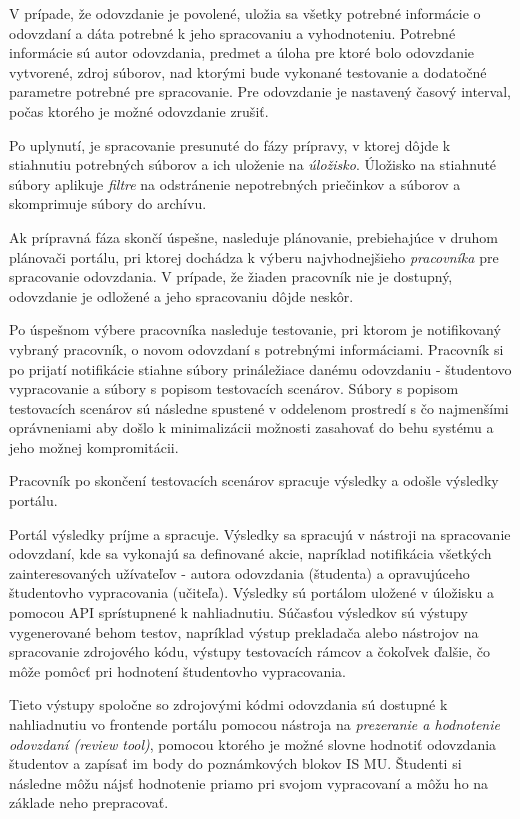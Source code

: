 \documentclass[
  digital, %
  twoside, %
  table,   %
  lof,     %
  lot,     %
]{fithesis3}
\begin{document}
V prípade, že odovzdanie je povolené, uložia sa všetky potrebné informácie o odovzdaní a dáta potrebné k jeho spracovaniu a vyhodnoteniu. Potrebné informácie sú autor odovzdania, predmet a úloha pre ktoré bolo odovzdanie vytvorené, zdroj súborov, nad ktorými bude vykonané testovanie a dodatočné parametre potrebné pre spracovanie. Pre odovzdanie je nastavený časový interval, počas ktorého je možné odovzdanie zrušiť.

Po uplynutí, je spracovanie presunuté do fázy prípravy, v ktorej dôjde k stiahnutiu potrebných súborov a ich uloženie na \emph{úložisko}. Úložisko na stiahnuté súbory aplikuje \emph{filtre} na odstránenie nepotrebných priečinkov a súborov a skomprimuje súbory do archívu.

Ak prípravná fáza skončí úspešne, nasleduje plánovanie, prebiehajúce v druhom plánovači portálu, pri ktorej dochádza k výberu najvhodnejšieho \emph{pracovníka} pre spracovanie odovzdania. V prípade, že žiaden pracovník nie je dostupný, odovzdanie je odložené a jeho spracovaniu dôjde neskôr.

Po úspešnom výbere pracovníka nasleduje testovanie, pri ktorom je notifikovaný vybraný pracovník, o novom odovzdaní s potrebnými informáciami. Pracovník si po prijatí notifikácie stiahne súbory prináležiace danému odovzdaniu - študentovo vypracovanie a súbory s popisom testovacích scenárov. Súbory s popisom testovacích scenárov sú následne spustené v oddelenom prostredí s čo najmenšími oprávneniami aby došlo k minimalizácii možnosti zasahovať do behu systému a jeho možnej kompromitácii.

Pracovník po skončení testovacích scenárov spracuje výsledky a odošle výsledky portálu.

Portál výsledky príjme a spracuje. Výsledky sa spracujú v nástroji na spracovanie odovzdaní, kde sa vykonajú sa definované akcie, napríklad notifikácia všetkých zainteresovaných užívateľov - autora odovzdania (študenta) a opravujúceho študentovho vypracovania (učiteľa). Výsledky sú portálom uložené v úložisku a pomocou API sprístupnené k nahliadnutiu. Súčasťou výsledkov sú výstupy vygenerované behom testov, napríklad výstup prekladača alebo nástrojov na spracovanie zdrojového kódu, výstupy testovacích rámcov a čokoľvek ďalšie, čo môže pomôcť pri hodnotení študentovho vypracovania.

Tieto výstupy spoločne so zdrojovými kódmi odovzdania sú dostupné k nahliadnutiu vo frontende portálu pomocou nástroja na \emph{prezeranie a hodnotenie odovzdaní (review tool)}, pomocou ktorého je možné slovne hodnotiť odovzdania študentov a zapísať im body do poznámkových blokov IS MU. Študenti si následne môžu nájsť hodnotenie priamo pri svojom vypracovaní a môžu ho na základe neho prepracovať. 
\end{document}

